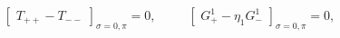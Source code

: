 \begin{equation}
  \label{bulkcurbc}
  \left[ \,\, T_{++}-T_{--} \,\,
  \right]_{\sigma=0,\pi} =0,\,\,\,\,\,\,\,\,\,\,\,\,\,\,\,
  \left[ \,\,  G^1_{+}-\eta_1 G^1_{-} \,\, \right]_{\sigma=0,\pi} =0 ,
\end{equation}

